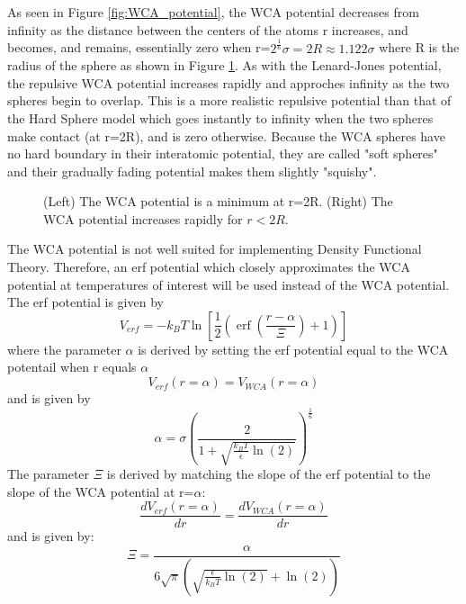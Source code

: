 \documentclass[12pt]{article}
\begin{document}
\noindent As seen in Figure \ref{fig:WCA_potential}, the WCA potential decreases from infinity as the distance between the centers of the atoms r increases, and becomes, and remains, essentially zero when r=$2^\frac{1}{6}\sigma=2R\approx{1.122}\sigma$ where R is the radius of the sphere as shown in Figure \ref{fig:TwoSpheres}. As with the Lenard-Jones potential, the repulsive WCA potential increases rapidly and approches infinity as the two spheres begin to overlap. This is a more realistic repulsive potential than that of the Hard Sphere model which goes instantly to infinity when the two spheres make contact (at r=2R), and is zero otherwise. Because the WCA spheres have no hard boundary in their interatomic potential, they are called "soft spheres" and their gradually fading potential makes them slightly "squishy".

\begin{figure}[h!]
    \centering
    \caption{(Left) The WCA potential is a minimum at r=2R. 
             (Right) The WCA potential increases rapidly for $r<2R$.}
    \label{fig:TwoSpheres}
    \end{figure} 

The WCA potential is not well suited for implementing Density Functional Theory.  Therefore, an erf potential which closely approximates the WCA potential at temperatures of interest will be used instead of the WCA potential. The erf potential is given by 
\begin{equation}
	{V_{erf}=-k_BT\ln\left[\frac{1}{2}\left(\operatorname{erf}\left(\frac{r-\alpha}{\Xi}\right)+1\right)\right]}
\end{equation} 
where the parameter $\alpha$ is derived by setting the erf potential equal to the WCA potentail when r equals $\alpha$ 
\begin{displaymath}{V_{erf}(r=\alpha)=V_{WCA}(r=\alpha)}\end{displaymath} 
and is given by 
\begin{equation}\label{alphaT}
	{\alpha=\sigma\left(\frac{2}{1+\sqrt{\frac{k_BT}{\epsilon}\ln(2)}}\right)^\frac{1}{6}}
\end{equation} 
The parameter $\Xi$ is derived by matching the slope of the erf potential to the slope of the WCA potential at r=$\alpha$:
\begin{displaymath}{\frac{dV_{erf}(r=\alpha)}{dr}=\frac{dV_{WCA}(r=\alpha)}{dr}}\end{displaymath} 
and is given by: 
\begin{equation}
	{\Xi=\frac{\alpha}{6\sqrt{\pi}\left(\sqrt{\frac{\epsilon}{k_BT}\ln(2)}+\ln(2)\right)}}
\end{equation} 
\end{document}
